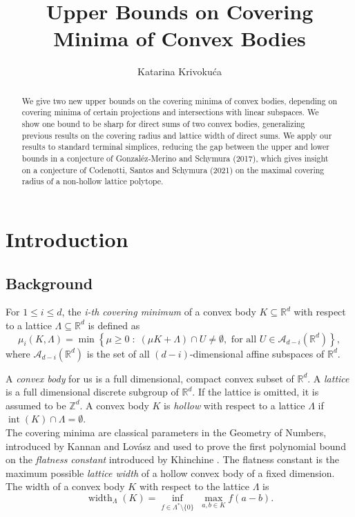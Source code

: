 \documentclass{amsart}
\title{Upper Bounds on Covering Minima of Convex Bodies}
\author{Katarina Krivoku\'ca}
\theoremstyle{definition}
\theoremstyle{remark}
\newcommand{\A}{\mathcal{A}}
\newcommand{\R}{\mathbb{R}}
\newcommand{\Z}{\mathbb{Z}}
\begin{document}
\begin{abstract}	We give two new upper bounds on the covering minima of convex bodies, depending on covering minima of certain projections and intersections with linear subspaces. We show one bound to be sharp for direct sums of two convex bodies, generalizing previous results on the covering radius and lattice width of direct sums. We apply our results to standard terminal simplices, reducing the gap between the upper and lower bounds in a conjecture of Gonzal\' ez-Merino and Schymura (2017), which gives insight on a conjecture of Codenotti, Santos and Schymura (2021) on the maximal covering radius of a non-hollow lattice polytope.

\end{abstract}

\maketitle

\section{Introduction}
\subsection{Background}

For $1\leqslant i \leqslant d$, the \textit{i-th covering minimum} of a convex body $K\subseteq \R^d$ with respect to a lattice $\Lambda\subseteq\R^d$ is defined as 
$$\mu_i(K,\Lambda)=\min \left\{\mu\geq 0 \; : \; \left(\mu K +\Lambda \right)\cap U\neq \emptyset, \text{ for all }U\in \A_{d-i}(\R^d) \right\},$$
where $\A_{d-i}(\R^d)$ is the set of all $(d-i)$-dimensional affine subspaces of $\R^d$. 

\noindent A \textit{convex body} for us is a full dimensional, compact convex subset of $\R^d$. A \textit{lattice} is a full dimensional discrete subgroup of $\R^d$. If the lattice is omitted, it is assumed to be $\Z^d$. A convex body $K$ is \textit{hollow} with respect to a lattice $\Lambda$ if $\operatorname{int}(K)\cap \Lambda=\emptyset$.\\



The covering minima are classical parameters in the Geometry of Numbers, introduced by Kannan and Lov\' asz \cite{KannanLovasz} and used to prove the first polynomial bound on the \textit{flatness constant} introduced by Khinchine \cite{Khinchine}. The flatness constant is the maximum possible \textit{lattice width} of a hollow convex body of a fixed dimension. The width of a convex body $K$ with respect to the lattice $\Lambda$ is
$$\operatorname{width}_\Lambda(K)=\inf_{f\in \Lambda^*\setminus \{0\}}\;\max_{a, b\in K} f(a-b).$$
\end{document}
